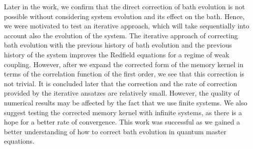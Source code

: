 Later in the work, we confirm that the direct correction of bath evolution is not possible without considering system evolution and its effect on the bath. Hence, we were motivated to test an iterative approach, which will take sequentially into account also the evolution of the system. 
The iterative approach of correcting bath evolution with the previous history of bath evolution and the previous history of the system improves the Redfield equations for a regime of weak coupling. However, after we expand the corrected form of the memory kernel in terms of the correlation function of the first order, we see that this correction is not trivial. It is concluded later that the correction and the rate of correction provided by the iterative ansatzes are relatively small. However, the quality of numerical results may be affected by the fact that we use finite systems. 
We also suggest testing the corrected memory kernel with infinite systems, as there is a hope for a better rate of convergence. This work was successful as we gained a better understanding of how to correct bath evolution in quantum master equations. 

